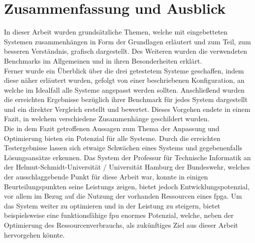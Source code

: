 \chapter{Zusammenfassung und Ausblick}\label{ch:schluss}
In dieser Arbeit wurden grundsätzliche Themen, welche mit eingebetteten Systemen zusammenhängen in Form der Grundlagen erläutert und zum Teil,
 zum besseren Verständnis, grafisch dargestellt. Des Weiteren wurden die verwendeten Benchmarks im Allgemeinen und in ihren Besonderheiten erklärt.\\
 Ferner wurde ein Überblick über die drei getestetem Systeme geschaffen, indem diese näher erläutert wurden, gefolgt von einer beschriebenen Konfiguration,
 an welche im Idealfall alle Systeme angepasst werden sollten. Anschließend wurden die erreichten Ergebnisse bezüglich ihrer Benchmark für jedes
 System dargestellt und ein direkter Vergleich erstellt und bewertet. Dieses Vorgehen endete in einem Fazit, in welchem verschiedene Zusammenhänge geschildert wurden.\\
Die in dem Fazit getroffenen Aussagen zum Thema der Anpassung und Optimierung bieten ein Potenzial für alle Systeme. Durch die erreichten Testergebnisse lassen sich etwaige
Schwächen eines Systems und gegebenenfalls Lösungsansätze erkennen. Das System der Professur für Technische Informatik an der Helmut-Schmidt-Universität / Universität Hamburg
der Bundeswehr, welches der ausschlaggebende Punkt für diese Arbeit war, konnte in einigen Beurteilungspunkten seine Leistungs zeigen, bietet jedoch Entwicklungspotenzial,
vor allem im Bezug auf die Nutzung der vorhanden Ressourcen eines \ac{fpga}. Um das System weiter zu optimieren und in der Leistung zu steigern, bietet beispielsweise eine
funktionsfähige \ac{fpu} enormes Potenzial, welche, neben der Optimierung des Ressourcenverbrauchs, als zukünftiges Ziel aus dieser Arbeit hervorgehen könnte.
